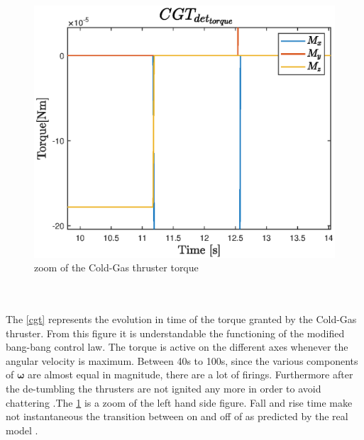 \documentclass[11pt]{article}
\begin{document}
\begin{minipage}{.5 \textwidth}
\begin{figure} [H]
\centering 
\includegraphics[scale=0.6]{zoom.eps}
\caption{ zoom of the Cold-Gas thruster torque}
\label{cgtt}
\end{figure}
\end{minipage}\\\\
The \ref{cgt} represents the evolution in time of the torque granted by the Cold-Gas thruster. From this figure it is understandable the functioning of the modified bang-bang control law. The torque is active on the different axes whenever the angular velocity is maximum. Between 40s to 100s, since the various components of $\boldsymbol{\omega}$ are almost equal in magnitude, there are a lot of firings. Furthermore after the de-tumbling the thrusters are not ignited any more in order to avoid chattering .The \ref{cgtt} is a zoom of the left hand side figure. Fall and rise time make not instantaneous the transition between on and off of  as predicted by the real model . 
\end{document}
